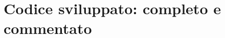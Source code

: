 \chapter{Codice sviluppato: completo e commentato}
\label{appendix:code}
\begin{center}
	
\end{center}

%
